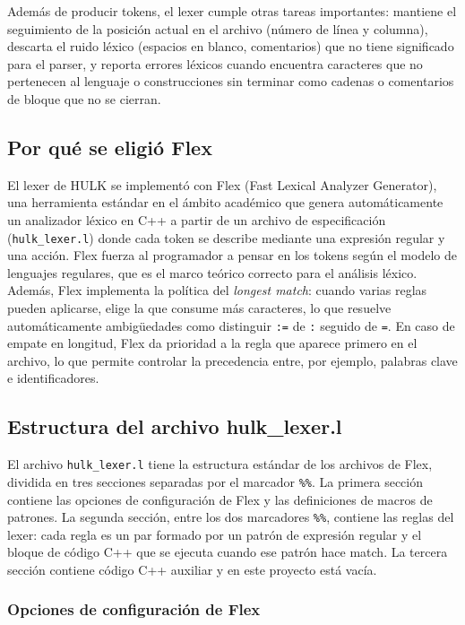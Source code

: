\documentclass[11pt,a4paper]{article}
\begin{document}
Además de producir tokens, el lexer cumple otras tareas importantes: mantiene el seguimiento de la posición actual en el archivo (número de línea y columna), descarta el ruido léxico (espacios en blanco, comentarios) que no tiene significado para el parser, y reporta errores léxicos cuando encuentra caracteres que no pertenecen al lenguaje o construcciones sin terminar como cadenas o comentarios de bloque que no se cierran.

\subsection{Por qué se eligió Flex}

El lexer de HULK se implementó con Flex (Fast Lexical Analyzer Generator), una herramienta estándar en el ámbito académico que genera automáticamente un analizador léxico en C++ a partir de un archivo de especificación (\texttt{hulk\_lexer.l}) donde cada token se describe mediante una expresión regular y una acción. Flex fuerza al programador a pensar en los tokens según el modelo de lenguajes regulares, que es el marco teórico correcto para el análisis léxico. Además, Flex implementa la política del \textit{longest match}: cuando varias reglas pueden aplicarse, elige la que consume más caracteres, lo que resuelve automáticamente ambigüedades como distinguir \texttt{:=} de \texttt{:} seguido de \texttt{=}. En caso de empate en longitud, Flex da prioridad a la regla que aparece primero en el archivo, lo que permite controlar la precedencia entre, por ejemplo, palabras clave e identificadores.

\subsection{Estructura del archivo hulk\_lexer.l}

El archivo \texttt{hulk\_lexer.l} tiene la estructura estándar de los archivos de Flex, dividida en tres secciones separadas por el marcador \texttt{\%\%}. La primera sección contiene las opciones de configuración de Flex y las definiciones de macros de patrones. La segunda sección, entre los dos marcadores \texttt{\%\%}, contiene las reglas del lexer: cada regla es un par formado por un patrón de expresión regular y el bloque de código C++ que se ejecuta cuando ese patrón hace match. La tercera sección contiene código C++ auxiliar y en este proyecto está vacía.

\subsubsection{Opciones de configuración de Flex}
\end{document}
